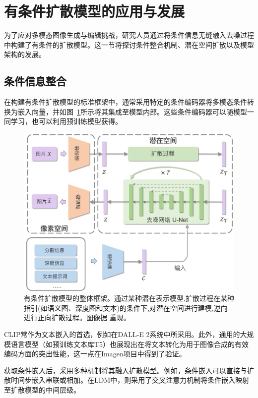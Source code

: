 \section{有条件扩散模型的应用与发展}
\label{conditional_diffusion_models}

为了应对多模态图像生成与编辑挑战，研究人员通过将条件信息无缝融入去噪过程中构建了有条件的扩散模型。这一节将探讨条件整合机制、潜在空间扩散以及模型架构的发展。

\subsection{条件信息整合}
\label{condition_integration}

在构建有条件扩散模型的标准框架中，通常采用特定的条件编码器将多模态条件转换为嵌入向量，并如图~\ref{diffusion_conditional}所示将其集成至模型内部。这些条件编码器可以随模型一同学习，也可以利用预训练模型获得。

\begin{figure}[h]
\centering
\includegraphics[width=0.8\linewidth]{figures/diffusion_conditional.pdf}
\caption{有条件扩散模型的整体框架。通过某种潜在表示模型,扩散过程在某种指引(如语义图、深度图和文本)的条件下,对潜在空间进行建模,逆向进行正向扩散过程。图像据 \cite{rombach2022high} 重现。}
\label{diffusion_conditional}
\end{figure}

CLIP常作为文本嵌入的首选，例如在DALL-E 2系统中所采用\cite{ramesh2022hierarchical}。此外，通用的大规模语言模型（如预训练文本库T5\cite{raffel2020exploring}）也展现出在将文本转化为用于图像合成的有效编码方面的突出性能，这一点在Imagen项目中得到了验证\cite{saharia2022photorealistic}。

获取条件嵌入后，采用多种机制将其融入扩散模型。例如，条件嵌入可以直接与扩散时间步嵌入串联或相加\cite{dhariwal2021diffusion, ho2022cascaded}。在LDM\cite{rombach2022high}中，则采用了交叉注意力机制将条件嵌入映射至扩散模型的中间层级。

